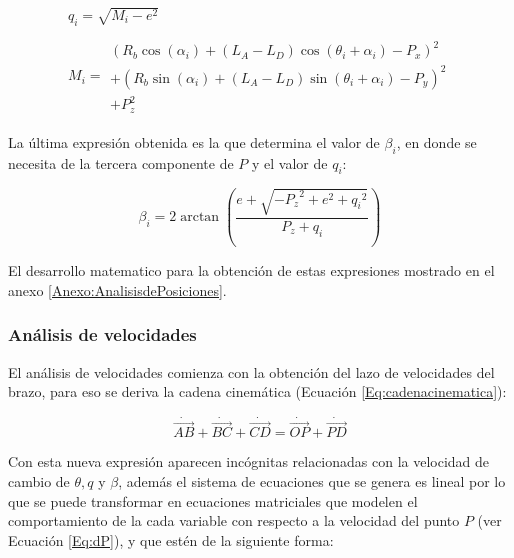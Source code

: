 \begin{subequations}
    \begin{eqnarray}
        q_{i}=\sqrt{M_i-e^2} \\
        \nonumber \\
        M_i =  \begin{array}{c}
            \left( R_b \cos\left(\alpha_i\right) + \left(L_A-L_D\right)\cos\left(\theta_i+\alpha_i\right) - P_x\right)^2 \\
            + \left( R_b \sin\left(\alpha_i\right) + \left(L_A-L_D\right)\sin\left(\theta_i+\alpha_i\right) - P_y\right)^2 \\
            + P_z^2 \label{Eq:M_i}
        \end{array}
    \end{eqnarray}
\end{subequations}

La última expresión obtenida es la que determina el valor de $\beta_i$, en donde se necesita de la tercera componente de $P$ y el valor de $q_i$:

\begin{equation}
    \beta_i = 2 \arctan\left( \frac{e+\sqrt{-{P_{z}}^2+e^2+{q_{i}}^2}}{P_{z}+q_{i}} \right)
\end{equation}

El desarrollo matematico para la obtención de estas expresiones mostrado en el anexo \ref{Anexo:AnalisisdePosiciones}.
\newpage

\subsubsection{Análisis de velocidades}
El análisis de velocidades comienza con la obtención del lazo de velocidades del brazo, para eso se deriva la cadena cinemática (Ecuación \ref{Eq:cadenacinematica}):

\begin{equation}
    \dot{\vec{AB}} + \dot{\vec{BC}} + \dot{\vec{CD}} = \dot{\vec{OP}} + \dot{\vec{PD}}
    \label{Eq:cadenavelocidades}
\end{equation}

Con esta nueva expresión aparecen incógnitas relacionadas con la velocidad de cambio de $\theta, q$ y $\beta$, además el sistema de ecuaciones que se genera es lineal por lo que se puede transformar en ecuaciones matriciales que modelen el comportamiento de la cada variable con respecto a la velocidad del punto $P$ (ver Ecuación \ref{Eq:dP}), y que estén de la siguiente forma:

